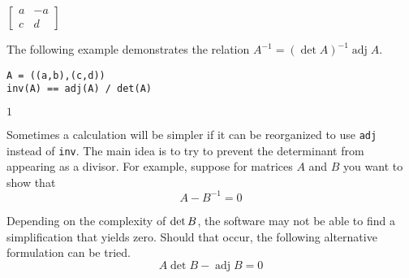 $\displaystyle
\begin{bmatrix}
a & -a
\\[1ex]
c & d
\end{bmatrix}
$

\bigskip

The following example demonstrates the relation
$A^{-1}=(\operatorname{det}A)^{-1}\operatorname{adj}A$.

{\color{blue}
\begin{verbatim}
A = ((a,b),(c,d))
inv(A) == adj(A) / det(A)
\end{verbatim}
}

$\displaystyle 1$

\bigskip

Sometimes a calculation will be simpler if it can be reorganized to use
\verb$adj$ instead of \verb$inv$.
The main idea is to try to prevent the determinant from appearing as a
divisor.
For example, suppose for matrices $A$ and $B$ you want to show that
\begin{equation*}
{A}-{B}^{-1}=0
\end{equation*}

Depending on the complexity of $\mathop{\rm det}B$, the software
may not be able to find a simplification that yields zero.
Should that occur, the following alternative formulation can be tried.
\begin{equation*}
A\operatorname{det}B-\operatorname{adj}B=0
\end{equation*}


